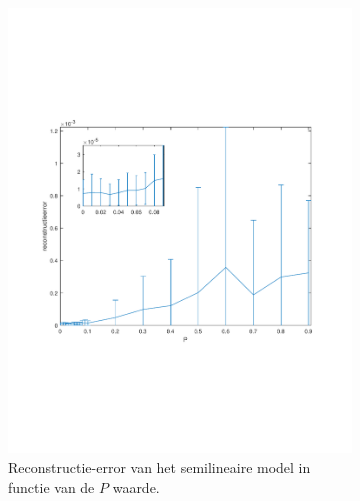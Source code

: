 \documentclass[12pt]{report}
\begin{document}
\begin{figure}

\begin{subfigure}[b]{0.5\textwidth}
\includegraphics[width=\textwidth,trim=0 200 0 175 cm]{PMC_AAM_10_100_E.pdf}
\caption{Reconstructie-error van het semilineaire model in functie van de $P$ waarde. \label{fig:AE}}
\end{subfigure}
\begin{subfigure}[b]{0.5\textwidth}

\end{subfigure}
\end{figure}
\end{document}
